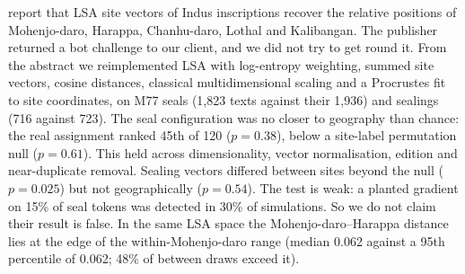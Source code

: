 \documentclass[11pt,a4paper]{article}
\begin{document}
\citet{recchia2016} report that LSA site vectors of Indus inscriptions recover the relative positions of Mohenjo-daro, Harappa, Chanhu-daro, Lothal and Kalibangan.
The publisher returned a bot challenge to our client, and we did not try to get round it. %
From the abstract we reimplemented LSA with log-entropy weighting, summed site vectors, cosine distances, classical multidimensional scaling and a Procrustes fit to site coordinates, on M77 seals (1,823 texts against their 1,936) and sealings (716 against 723). %
The seal configuration was no closer to geography than chance: the real assignment ranked 45th of 120 ($p = 0.38$), below a site-label permutation null ($p = 0.61$). %
This held across dimensionality, vector normalisation, edition and near-duplicate removal. %
Sealing vectors differed between sites beyond the null ($p = 0.025$) but not geographically ($p = 0.54$). %
The test is weak: a planted gradient on 15\% of seal tokens was detected in 30\% of simulations. %
So we do not claim their result is false.
In the same LSA space the Mohenjo-daro--Harappa distance lies at the edge of the within-Mohenjo-daro range (median 0.062 against a 95th percentile of 0.062; 48\% of between draws exceed it). %
\end{document}
